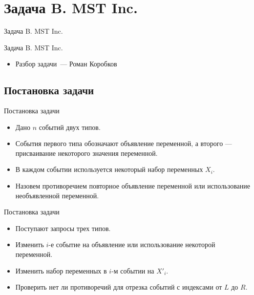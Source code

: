 \section{Задача B. MST Inc.}

\begin{frame}[t]{Задача B. MST Inc.}
	
	\vspace{2cm}
	\begin{center}
		\LARGE Задача B. MST Inc.
	\end{center}
\end{frame}

\begin{frame}[t]{}
  \vspace{3cm}

  \begin{itemize}
    \item Разбор задачи~--- Роман Коробков
  \end{itemize}
\end{frame}

\subsection{Постановка задачи}

\begin{frame}[t]{Постановка задачи}
\begin{itemize}
	\item Дано $n$ событий двух типов.
	\item События первого типа обозначают объявление переменной, а второго --- присваивание некоторого значения переменной.
	\item В каждом событии используется некоторый набор переменных $X_{i}$.
	\item Назовем противоречием повторное объявление переменной или использование необъявленной переменной.
\end{itemize}
\end{frame}


\begin{frame}[t]{Постановка задачи}
\begin{itemize}	
	\item Поступают запросы трех типов.
	\item Изменить $i$-е событие на объявление или использование некоторой переменной.
	\item Изменить набор переменных в $i$-м событии на $X'_{i}$. 
	\item Проверить нет ли противоречий для отрезка событий с индексами от $L$ до $R$. 
\end{itemize}
\end{frame}



